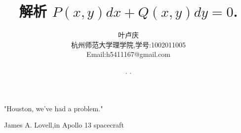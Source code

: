\documentclass[a4paper, 12pt]{article} %
\makeatletter
\renewcommand{\maketitle}{ %
  \renewcommand\refname{参考文献}
  \newcommand{\D}{\displaystyle}\newcommand{\ri}{\Rightarrow}
  \newcommand{\ds}{\displaystyle} \renewcommand{\ni}{\noindent}
  \newcommand{\pa}{\partial} \newcommand{\Om}{\Omega}
  \newcommand{\om}{\omega} \newcommand{\sik}{\sum_{i=1}^k}
  \newcommand{\vov}{\Vert\omega\Vert} \newcommand{\Umy}{U_{\mu_i,y^i}}
  \newcommand{\lamns}{\lambda_n^{^{\scriptstyle\sigma}}}
  \newcommand{\chiomn}{\chi_{_{\Omega_n}}}
  \newcommand{\ullim}{\underline{\lim}} \newcommand{\bsy}{\boldsymbol}
  \newcommand{\mvb}{\mathversion{bold}} \newcommand{\la}{\lambda}
  \newcommand{\La}{\Lambda} \newcommand{\va}{\varepsilon}
  \newcommand{\be}{\beta} \newcommand{\al}{\alpha}
  \newcommand{\dis}{\displaystyle} \newcommand{\R}{{\mathbb R}}
  \newcommand{\N}{{\mathbb N}} \newcommand{\cF}{{\mathcal F}}
  \newcommand{\gB}{{\mathfrak B}} \newcommand{\eps}{\epsilon}
  \begin{flushright} %
    {\LARGE\@title} %
    
    \vspace{50pt} %
    
    {\large\@author} %
    \\\@date %
    
    \vspace{40pt} %
  \end{flushright}
}
\makeatother
\begin{document}
\begin{CJK}{UTF8}{gbsn}
  \title{\textbf{解析 $P(x,y)dx+Q(x,y)dy=0$.}} 
  \setlength{}
\epigraph{"Houston, we've had a problem."}{James A. Lovell,in Apollo
  13 spacecraft}
  \author{\small{叶卢庆}\\{\small{杭州师范大学理学院,学号:1002011005}}\\{\small{Email:h5411167@gmail.com}}} %
  \renewcommand{\today}{\number\year. \number\month. \number\day}
  \date{\today} %
  
  
  
  \maketitle %
  
  
  
  
  
  
  

\end{CJK}
\end{document}
